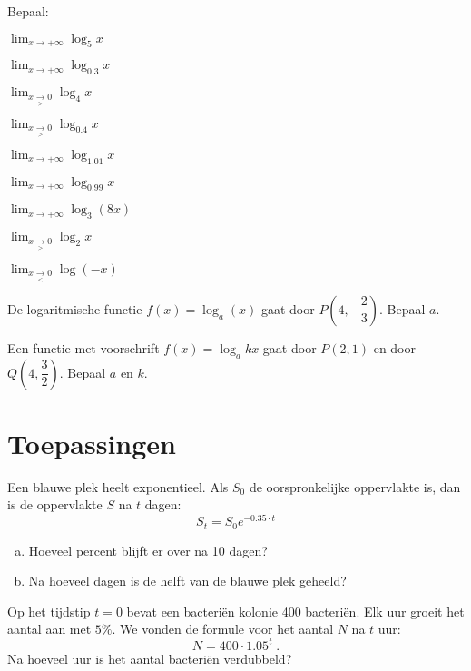 \documentclass[12pt,twoside,a4paper]{article}
\begin{document}
\begin{oefening} %
Bepaal:
\begin{exlist}{2}
  \item $\displaystyle\lim_{x\to +\infty}\log_5 x$
  \item $\displaystyle\lim_{x\to +\infty}\log_{0.3} x$
  \item $\displaystyle\lim_{x\underset{>}{\to} 0}\log_4 x$
  \item $\displaystyle\lim_{x\underset{>}{\to} 0}\log_{0.4} x$
  \item $\displaystyle\lim_{x\to +\infty}\log_{1.01} x$
  \item $\displaystyle\lim_{x\to +\infty}\log_{0.99} x$
  \item $\displaystyle\lim_{x\to +\infty}\log_{3} (8x)$
  \item $\displaystyle\lim_{x\underset{>}{\to} 0}\log_{2} x$
  \item $\displaystyle\lim_{x\underset{<}{\to} 0}\log (-x)$
\end{exlist}
\end{oefening}

\begin{oefening}
  De logaritmische functie $f(x)=\log_a(x)$ gaat door $P(4,-\dfrac{2}{3})$. Bepaal $a$.
\end{oefening}

\begin{oefening} %
Een functie met voorschrift $f(x)=\log_a kx$ gaat door $P(2,1)$ en door $Q(4,\dfrac{3}{2})$. Bepaal $a$ en $k$.
\end{oefening}

\cleardoublepage
\section{Toepassingen}

\begin{oefening} %
Een blauwe plek heelt exponentieel. Als $S_0$ de oorspronkelijke oppervlakte is, dan is de oppervlakte $S$ na $t$ dagen:
$$S_t=S_0e^{-0.35\cdot t}$$
\begin{enumerate}[(a)]
  \item Hoeveel percent blijft er over na 10 dagen?
  \item Na hoeveel dagen is de helft van de blauwe plek geheeld?
\end{enumerate}
\end{oefening}

\begin{oefening}
Op het tijdstip $t=0$ bevat een bacteriën kolonie 400 bacteriën. Elk uur groeit het aantal aan met $5 \%$. We vonden de formule voor het aantal $N$ na $t$ uur:
$$N=400\cdot 1.05^t\;.$$
Na hoeveel uur is het aantal bacteriën verdubbeld?
\end{oefening}
\end{document}
